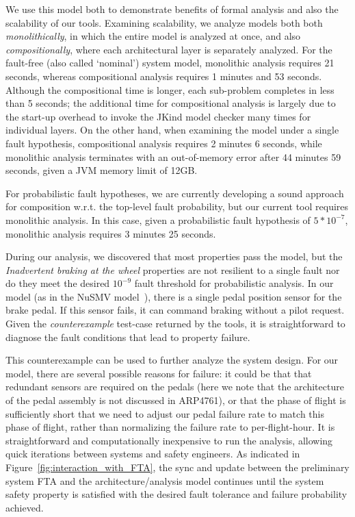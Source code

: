 We use this model both to demonstrate benefits of formal analysis and also the scalability of our tools.  Examining scalability, we analyze models both both {\em monolithically}, in which the entire model is analyzed at once, and also {\em compositionally}, where each architectural layer is separately analyzed.
%
For the fault-free (also called `nominal') system model, monolithic analysis requires 21 seconds, whereas compositional analysis requires 1 minutes and 53 seconds.  Although the compositional time is longer, each sub-problem completes in less than 5 seconds; the additional time for compositional analysis is largely due to the start-up overhead to invoke the JKind model checker many times for individual layers.  On the other hand, when examining the model under a single fault hypothesis, compositional analysis requires 2 minutes 6 seconds, while monolithic analysis terminates with an out-of-memory error after 44 minutes 59 seconds, given a JVM memory limit of 12GB.

For probabilistic fault hypotheses, we are currently developing a sound approach for composition w.r.t. the top-level fault probability, but our current tool requires monolithic analysis.  In this case, given a probabilistic fault hypothesis of $5*10^{-7}$, monolithic analysis requires 3 minutes 25 seconds.

During our analysis, we discovered that most properties pass the model, but the \textit{Inadvertent braking at the wheel} properties are not resilient to a single fault nor do they meet the desired $10^{-9}$ fault threshold for probabilistic analysis.  In our model (as in the NuSMV model~\cite{DBLP:conf/cav/BozzanoCPJKPRT15}), there is a single pedal position sensor for the brake pedal.  If this sensor fails, it can command braking without a pilot request.  Given the {\em counterexample} test-case returned by the tools, it is straightforward to diagnose the fault conditions that lead to property failure.

This counterexample can be used to further analyze the system design.  For our model, there are several possible reasons for failure: it could be that that redundant sensors are required on the pedals (here we note that the architecture of the pedal assembly is not discussed in ARP4761), or that the phase of flight is sufficiently short that we need to adjust our pedal failure rate to match this phase of flight, rather than normalizing the failure rate to per-flight-hour.  It is straightforward and computationally inexpensive to run the analysis, allowing quick iterations between systems and safety engineers. As indicated in Figure~\ref{fig:interaction_with_FTA}, the sync and update between the preliminary system FTA and the architecture/analysis model continues until the system safety property is satisfied with the desired fault tolerance and failure probability achieved.

